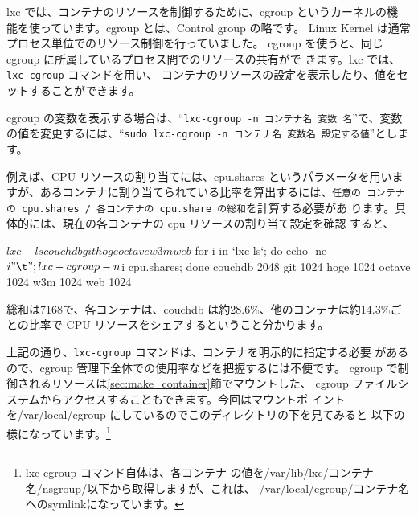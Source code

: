 \documentclass[mingoth,a4paper]{jsarticle}
\begin{document}
lxc では、コンテナのリソースを制御するために、cgroup というカーネルの機
能を使っています。cgroup とは、Control group の略です。
Linux Kernel は通常プロセス単位でのリソース制御を行っていました。
cgroup を使うと、同じ cgroup に所属しているプロセス間でのリソースの共有がで
きます。lxc では、\texttt{lxc-cgroup} コマンドを用い、
コンテナのリソースの設定を表示したり、値をセットすることができます。

cgroup の変数を表示する場合は、``\texttt{lxc-cgroup -n コンテナ名 変数
名}''で、変数の値を変更するには、``\texttt{sudo lxc-cgroup -n コンテナ名
変数名 設定する値}''とします。

例えば、CPU リソースの割り当てには、cpu.shares というパラメータを用いま
すが、あるコンテナに割り当てられている比率を算出するには、\texttt{任意の
コンテナの cpu.shares / 各コンテナの cpu.share の総和}を計算する必要があ
ります。具体的には、現在の各コンテナの cpu リソースの割り当て設定を確認
すると、

\begin{commandline}
$ lxc-ls
couchdb  git  hoge  octave  w3m  web
$ for i in `lxc-ls`; do echo -ne $i"\t"; lxc-cgroup -n $i cpu.shares; done
couchdb	2048
git	1024
hoge	1024
octave	1024
w3m	1024
web	1024
\end{commandline}

総和は7168で、各コンテナは、couchdb は約28.6\%、他のコンテナは約14.3\%ご
との比率で CPU リソースをシェアするということ分かります。

上記の通り、\texttt{lxc-cgroup} コマンドは、コンテナを明示的に指定する必要
があるので、cgroup 管理下全体での使用率などを把握するには不便です。
cgroup で制御されるリソースは\ref{sec:make_container}節でマウントした、
cgroup ファイルシステムからアクセスすることもできます。今回はマウントポ
イントを/var/local/cgroup にしているのでこのディレクトリの下を見てみると
以下の様になっています。\footnote{lxc-cgroup コマンド自体は、各コンテナ
の値を/var/lib/lxc/コンテナ名/nsgroup/以下から取得しますが、これは、
/var/local/cgroup/コンテナ名 へのsymlinkになっています。}
\end{document}
